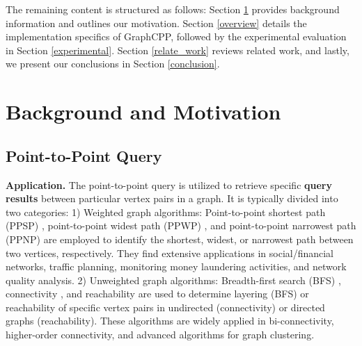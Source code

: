 \documentclass[10pt,journal,compsoc]{IEEEtran}
\begin{document}
The remaining content is structured as follows: Section \ref{motivation} provides background information and outlines our motivation. Section \ref{overview} details the implementation specifics of GraphCPP, followed by the experimental evaluation in Section \ref{experimental}. Section \ref{relate_work} reviews related work, and lastly, we present our conclusions in Section \ref{conclusion}.


\vspace{-8pt}
\section{Background and Motivation}\label{motivation}


\vspace{-4pt}
\subsection{Point-to-Point Query}\label{2.1}
\vspace{-4pt}
{\bf{Application.}} The point-to-point query is utilized to retrieve specific {\bf{query results}} between particular vertex pairs in a graph. It is typically divided into two categories: 1) Weighted graph algorithms: Point-to-point shortest path (PPSP) \cite{ppsp}, point-to-point widest path (PPWP) \cite{ppwp}, and point-to-point narrowest path (PPNP) \cite{ppnp} are employed to identify the shortest, widest, or narrowest path between two vertices, respectively. They find extensive applications in social/financial networks, traffic planning, monitoring money laundering activities, and network quality analysis. 2) Unweighted graph algorithms: Breadth-first search (BFS) \cite{bfs}, connectivity \cite{connectivity}, and reachability \cite{reachability} are used to determine layering (BFS) or reachability of specific vertex pairs in undirected (connectivity) or directed graphs (reachability). These algorithms are widely applied in bi-connectivity, higher-order connectivity, and advanced algorithms for graph clustering.
\end{document}
